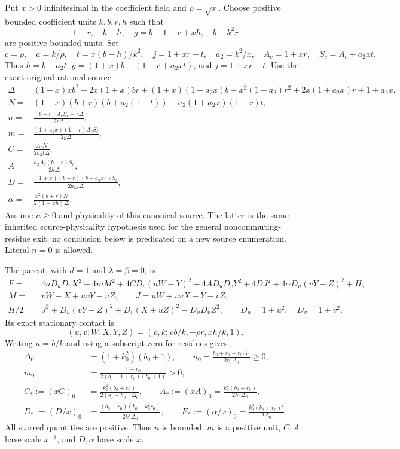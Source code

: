 Put $x>0$ infinitesimal in the coefficient field and $\rho=\sqrt{x}$.
Choose positive bounded coefficient units $k,b,r,h$ such that
\[
 1-r,\quad b-h,\quad g=b-1+r+xh,\quad b-k^2r
\]
are positive bounded units.  Set
\[
 c=\rho,\quad a=k/\rho,\quad t=x(b-h)/k^2,
 \quad j=1+xr-t,\quad a_2=k^2/x,
 \quad A_c=1+xr,\quad S_c=A_c+a_2xt.
\]
Thus $h=b-a_2t$, $g=(1+x)b-(1-r+a_2xt)$, and $j=1+xr-t$.
Use the exact original rational source
\begin{align*}
 \Delta={}&(1+x)xb^2+2x(1+x)br+(1+x)(1+a_2x)b
       +x^2(1-a_2)r^2+2x(1+a_2x)r+1+a_2x,\\
 N={}&(1+x)(b+r)(b+a_2(1-t))-a_2(1+a_2x)(1-r)t,\\
 n={}&\frac{(b+r)A_cS_c-r\Delta}{2r\Delta},\\
 m={}&\frac{(1+a_2x)(1-r)A_cS_c}{2g\Delta},\\
 C={}&\frac{A_cN}{2a_2t\Delta},\\
 A={}&\frac{a_2A_c(b+r)S_c}{2h\Delta},\\
 D={}&\frac{(1+x)(b+r)(b-a_2xr)S_c}{2a_2j\Delta},\\
 \alpha={}&\frac{x^2(b+r)N}{2(1-xh)\Delta}.
\end{align*}
Assume $n\geq0$ and physicality of this canonical source.  The latter
is the same inherited source-physicality hypothesis used for the
general noncommuting-residue exit; no conclusion below is predicated
on a new source enumeration.  Literal $n=0$ is allowed.

The parent, with $d=1$ and $\lambda=\beta=0$, is
\begin{align*}
 F={}&4nD_uD_vX^2+4mM^2+4CD_v(uW-Y)^2+4AD_uD_vY^2
                +4DJ^2+4\alpha D_u(vY-Z)^2+H,\\
 M={}&vW-X+uvY-uZ,\qquad J=uW+uvX-Y-vZ,\\
 H/2={}&J^2+D_u(vY-Z)^2+D_v(X+uZ)^2-D_uD_vZ^2,
 \qquad D_u=1+u^2,\quad D_v=1+v^2.
\end{align*}
Its exact stationary contact is
\[
 (u,v;W,X,Y,Z)=(\rho,k;\rho b/k,-\rho r,xh/k,1).
\]
Writing $\kappa=b/k$ and using a subscript zero for residues gives
\begin{align*}
 \Delta_0&=(1+k_0^2)(b_0+1),\qquad
 n_0=\frac{b_0+r_0-r_0\Delta_0}{2r_0\Delta_0}\geq0,\\
 m_0&=\frac{1-r_0}{2(b_0-1+r_0)(b_0+1)}>0,\\
 C_*:=(xC)_0&=\frac{k_0^2(b_0+r_0)}{2(b_0-h_0)\Delta_0},\qquad
 A_*:=(xA)_0=\frac{k_0^2(b_0+r_0)}{2h_0\Delta_0},\\
 D_*:=(D/x)_0&=\frac{(b_0+r_0)(b_0-k_0^2r_0)}{2k_0^2\Delta_0},\qquad
 E_*:=(\alpha/x)_0=\frac{k_0^2(b_0+r_0)^2}{2\Delta_0}.
\end{align*}
All starred quantities are positive.  Thus $n$ is bounded, $m$ is a
positive unit, $C,A$ have scale $x^{-1}$, and $D,\alpha$ have scale $x$.

